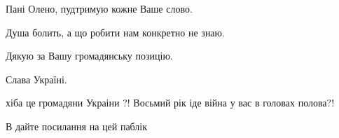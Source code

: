 \begin{itemize}
 
Пані Олено, пудтримую кожне Ваше слово.

Душа болить, а що робити нам конкретно не знаю.

Дякую за Вашу громадянську позицію.

Слава Україні.


 

хіба це громадяни Украіни ?! Восьмий рік іде війна у вас в головах полова?!

 
В дайте посилання на цей паблік

\end{itemize}

